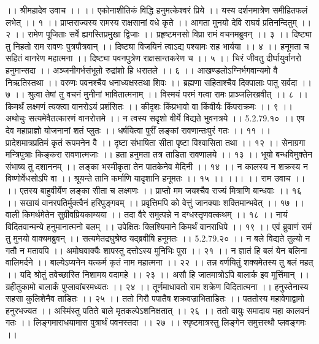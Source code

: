 ।। श्रीमहादेव उवाच ।। ।।
एकोनाशीतिकं विद्धि हनुमत्केश्वरं प्रिये ।।
यस्य दर्शनमात्रेण समीहितफलं लभेत् ।। १ ।।
प्राप्तराज्यस्य रामस्य राक्षसानां वधे कृते ।।
आगता मुनयो देवि राघवं प्रतिनन्दितुम् ।। २ ।।
रामेण पूजिताः सर्वे ह्यगस्तिप्रमुखा द्विजाः ।।
प्रहृष्टमनसो विप्रा रामं वचनमब्रुवन् ।। ३ ।।
दिष्ट्या तु निहतो राम रावणः पुत्रपौत्रवान् ।।
दिष्ट्या विजयिनं त्वाऽद्य पश्यामः सह भार्यया ।। ४ ।।
हनूमता च सहितं वानरेण महात्मना ।।
दिष्ट्या पवनपुत्रेण राक्षसान्तकरेण च ।। ५ ।।
चिरं जीवतु दीर्घायुर्वानरो हनुमान्सदा ।।
अञ्जनीगर्भसंभूतो रुद्रांशो हि धरातले ।। ६ ।।
आखण्डलोऽग्निर्भगवान्यमो वै निऋतिस्तथा ।।
वरुणः पवनश्चैव धनाध्यक्षस्तथा शिवः ।।
ब्रह्मणा सहिताश्चैव दिक्पालाः पातु सर्वदा ।। ७ ।।
श्रुत्वा तेषां तु वचनं मुनीनां भावितात्मनाम् ।।
विस्मयं परमं गत्वा रामः प्राञ्जलिरब्रवीत् ।। ८ ।।
किमर्थं लक्ष्मणं त्यक्त्वा वानरोऽयं प्रशंसितः ।।
कीदृशः किंप्रभावो वा किंवीर्यः किंपराक्रमः ।। ९ ।।
अथोचुः सत्यमेवैतत्कारणं वानरोत्तमे ।।
न त्वस्य सदृशो वीर्ये विद्यते भुवनत्रये ।। 5.2.79.१० ।।
एष देव महाप्राज्ञो योजनानां शतं प्लुतः ।।
धर्षयित्वा पुरीं लङ्कां रावणान्तःपुरं गतः ।। ११ ।।
प्रादेशमात्रप्रतिमं कृतं रूपमनेन वै ।।
दृष्टा संभाषिता सीता पृष्टा विश्वासिता तथा ।। १२ ।।
सेनाग्रगा मन्त्रिपुत्राः किङ्करा रावणात्मजाः ।।
हता हनुमता तत्र ताडिता रावणालये ।। १३ ।।
भूयो बन्धविमुक्तेन संभाष्य तु दशाननम् ।।
लङ्का भस्मीकृता तेन पातकेनेव मेदिनी ।। १४ ।।
न कालस्य न शक्रस्य न विष्णोर्वेधसोऽपि वा ।।
श्रूयन्ते तानि कर्माणि यादृशानि हनूमतः ।। १५ ।। ।।।
।। राम उवाच ।। ।।
एतस्य बाहुवीर्येण लङ्का सीता च लक्ष्मणः ।।
प्राप्तो मम जयश्चैव राज्यं मित्राणि बान्धवाः ।। १६ ।।
सखायं वानरपतिर्मुक्त्वैनं हरिपुङ्गवम् ।।
प्रवृत्तिमपि को वेत्तुं जानक्याः शक्तिमान्भवेत् ।। १७ ।।
वाली किमर्थमेतेन सुग्रीवप्रियकाम्यया ।।
तदा वैरे समुत्पन्ने न दग्धस्तृणवत्कथम् ।। १८ ।।
नायं विदितवान्मन्ये हनुमानात्मनो बलम् ।।
उपेक्षितः क्लिश्यिमाने किमर्थं वानराधिपे ।। १९ ।।
एवं ब्रुवाणं रामं तु मुनयो वाक्यमब्रुवन् ।।
सत्यमेतद्रघुश्रेष्ठ यद्ब्रवीषि हनूमतः ।। 5.2.79.२० ।।
न बले विद्यते तुल्यो न गतौ न मतावपि ।।
अमोघवाक्यैः शापस्तु दत्तोऽस्य मुनिभिः पुरा ।। २१ ।।
न ज्ञातं हि बलं येन बलिना वालिमर्दने ।।
बाल्येऽप्यनेन यत्कर्म कृतं नाम महात्मना ।। २२ ।।
तन्न वर्णयितुं शक्यमेतस्य तु बलं महत् ।।
यदि श्रोतुं तवेच्छास्ति निशामय वदामहे ।। २३ ।।
असौ हि जातमात्रोऽपि बालार्क इव मूर्त्तिमान् ।।
ग्रहीतुकामो बालार्कं पुप्लावांबरमध्यतः ।। २४ ।।
तूर्णमाधावतो राम शक्रेण विदितात्मना ।।
हनुस्तेनास्य सहसा कुलिशेनैव ताडितः ।। २५ ।।
ततो गिरौ पपातैष शक्रवज्राभिताडितः ।।
पततोस्य महावेगाद्वामो हनुरभज्यत ।।
अस्मिंस्तु पतिते बाले मृतकल्पेऽशनिक्षतात् ।। २६ ।।
ततो वायुः समादाय महा कालवनं गतः ।।
लिङ्गमाराधयामास पुत्रार्थं पवनस्तदा ।। २७ ।।
स्पृष्टमात्रस्तु लिङ्गेन समुत्तस्थौ प्लवङ्गमः ।।
